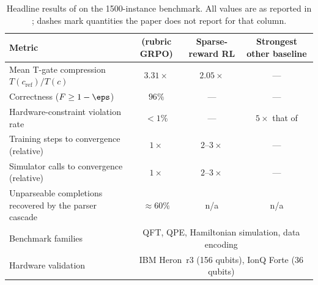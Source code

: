 \begin{table}[htbp]
\caption{Headline results of \rubriq{} on the \num{1500}-instance benchmark. All values are as reported in \cite{guo2026rubriq}; dashes mark quantities the paper does not report for that column.}
\label{tab:syn:results}
\centering\footnotesize
\begin{tabularx}{\textwidth}{@{}X c c c@{}}
\toprule
Metric & \rubriq{} (rubric GRPO) & Sparse-reward RL & Strongest other baseline \\
\midrule
Mean T-gate compression $T(c_{\mathrm{ref}})/T(c)$ & $3.31\times$ & $2.05\times$ & --- \\
Correctness ($F\ge 1-\eps$) & $96\%$ & --- & --- \\
Hardware-constraint violation rate & $<1\%$ & --- & $5\times$ that of \rubriq{} \\
Training steps to convergence (relative) & $1\times$ & $2$--$3\times$ & --- \\
Simulator calls to convergence (relative) & $1\times$ & $2$--$3\times$ & --- \\
Unparseable completions recovered by the parser cascade & $\approx 60\%$ & n/a & n/a \\
Benchmark families & \multicolumn{3}{c}{QFT, QPE, Hamiltonian simulation, data encoding} \\
Hardware validation & \multicolumn{3}{c}{IBM Heron~r3 (156 qubits), IonQ Forte (36 qubits)} \\
\bottomrule
\end{tabularx}
\end{table}

